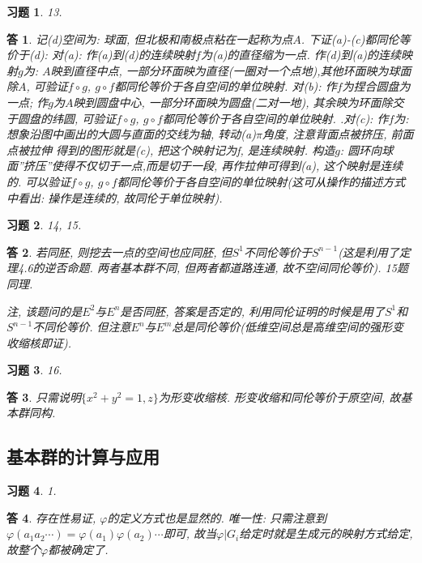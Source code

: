 \documentclass{ctexart}%
\newtheorem*{exercise}{习题}
\newtheorem*{solution}{答}
\theoremstyle{definition}
\theoremstyle{remark}
\begin{document}
\begin{exercise}13.
\end{exercise}
\begin{solution}
记(d)空间为: 球面, 但北极和南极点粘在一起称为点$A$. 下证(a)-(c)都同伦等价于(d): 对(a): 作(a)到(d)的连续映射$f$为(a)的直径缩为一点. 作(d)到(a)的连续映射$g$为: $A$映到直径中点, 一部分环面映为直径(一圈对一个点地),其他环面映为球面除$A$, 可验证$f\circ g$, $g\circ f$都同伦等价于各自空间的单位映射. 对(b): 作$f$为捏合圆盘为一点; 作$g$为$A$映到圆盘中心, 一部分环面映为圆盘(二对一地), 其余映为环面除交于圆盘的纬圆, 可验证$f\circ g$, $g\circ f$都同伦等价于各自空间的单位映射. .对(c): 作$f$为: 想象沿图中画出的大圆与直面的交线为轴, 转动(a)$\pi$角度, 注意背面点被挤压, 前面点被拉伸 得到的图形就是(c), 把这个映射记为f, 是连续映射. 构造$g$: 圆环向球面''挤压''使得不仅切于一点,而是切于一段, 再作拉伸可得到(a), 这个映射是连续的. 可以验证$f\circ g$, $g\circ f$都同伦等价于各自空间的单位映射(这可从操作的描述方式中看出: 操作是连续的, 故同伦于单位映射). 
\end{solution}
\begin{exercise}14, 15.
\end{exercise}
\begin{solution}
若同胚, 则挖去一点的空间也应同胚, 但$S^1$不同伦等价于$S^{n-1}$(这是利用了定理4.6的逆否命题. 两者基本群不同, 但两者都道路连通, 故不空间同伦等价). 15题同理. 

注, 该题问的是$E^2$与$E^n$是否同胚, 答案是否定的, 利用同伦证明的时候是用了$S^1$和$S^{n-1}$不同伦等价. 但注意$E^n$与$E^m$总是同伦等价(低维空间总是高维空间的强形变收缩核即证).
\end{solution}
\begin{exercise}16.
\end{exercise}
\begin{solution}只需说明$\{x^2+y^2=1,z\}$为形变收缩核. 形变收缩和同伦等价于原空间, 故基本群同构.
\end{solution}


\subsection{基本群的计算与应用}
\begin{exercise}1.
\end{exercise}
\begin{solution}存在性易证, $\varphi$的定义方式也是显然的. 唯一性: 只需注意到$\varphi(a_1a_2\cdots)=\varphi(a_1)\varphi(a_2)\cdots$即可, 故当$\varphi|G_i$给定时就是生成元的映射方式给定, 故整个$\varphi$都被确定了. 
\end{solution}
\end{document}
